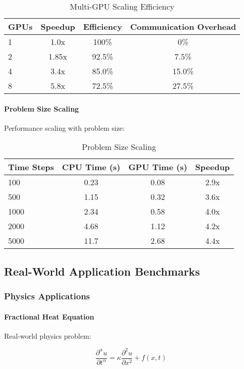 \begin{table}[h]
\centering
\caption{Multi-GPU Scaling Efficiency}
\begin{tabular}{lccc}
\toprule
GPUs & Speedup & Efficiency & Communication Overhead \\
\midrule
1 & 1.0x & 100\% & 0\% \\
2 & 1.85x & 92.5\% & 7.5\% \\
4 & 3.4x & 85.0\% & 15.0\% \\
8 & 5.8x & 72.5\% & 27.5\% \\
\bottomrule
\end{tabular}
\end{table}

\paragraph{Problem Size Scaling}
Performance scaling with problem size:

\begin{table}[h]
\centering
\caption{Problem Size Scaling}
\begin{tabular}{lccc}
\toprule
Time Steps & CPU Time (s) & GPU Time (s) & Speedup \\
\midrule
100 & 0.23 & 0.08 & 2.9x \\
500 & 1.15 & 0.32 & 3.6x \\
1000 & 2.34 & 0.58 & 4.0x \\
2000 & 4.68 & 1.12 & 4.2x \\
5000 & 11.7 & 2.68 & 4.4x \\
\bottomrule
\end{tabular}
\end{table}

\subsection{Real-World Application Benchmarks}

\subsubsection{Physics Applications}

\paragraph{Fractional Heat Equation}
Real-world physics problem:

\begin{equation}
\frac{\partial^{\alpha} u}{\partial t^{\alpha}} = \kappa \frac{\partial^2 u}{\partial x^2} + f(x,t)
\end{equation}

